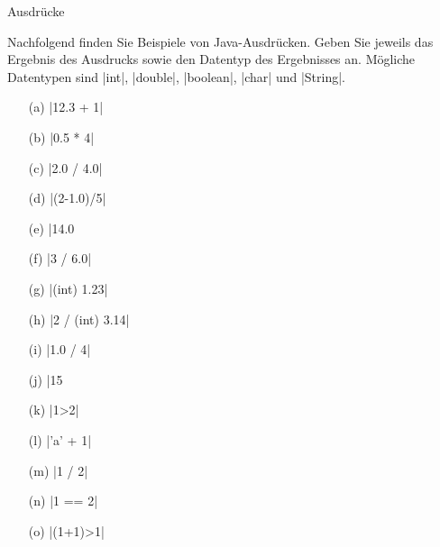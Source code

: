 \begin{exercise}{Ausdrücke}

\begin{body}
Nachfolgend finden Sie Beispiele von Java-Ausdrücken. Geben Sie jeweils das Ergebnis des Ausdrucks sowie den 
Datentyp des Ergebnisses an. Mögliche Datentypen sind \code|int|, \code|double|, \code|boolean|, \code|char| und \code|String|.
\begin{center}
\begin{minipage}{0.3\textwidth}
\begin{itemize}
\item[(a)] \code|12.3 + 1|
\item[(b)] \code|0.5 * 4|
\item[(c)] \code|2.0 / 4.0|
\item[(d)] \code|(2-1.0)/5| 
\item[(e)] \code|14.0 %
\end{itemize}
\end{minipage}
\begin{minipage}{0.3\textwidth}
\begin{itemize}
\item[(f)] \code|3 / 6.0|
\item[(g)] \code|(int) 1.23|
\item[(h)] \code|2 / (int) 3.14|
\item[(i)] \code|1.0 / 4|
\item[(j)] \code|15 %
\end{itemize}
\end{minipage}
\begin{minipage}{0.3\textwidth}
\begin{itemize}
\item[(k)] \code|1>2|
\item[(l)] \code|'a' + 1|
\item[(m)] \code|1 / 2|
\item[(n)] \code|1 == 2|
\item[(o)] \code|(1+1)>1|
\end{itemize}
\end{minipage}
\end{center}
\end{body}

\begin{solution}


\end{solution}
\end{exercise}
